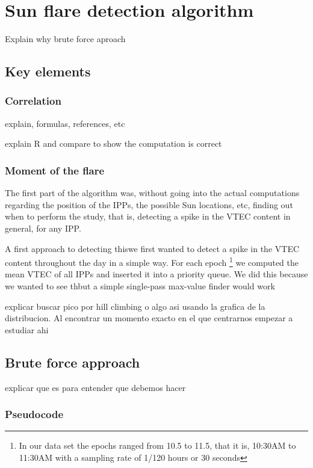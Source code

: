 \chapter{Sun flare detection algorithm}

Explain why brute force aproach


\section{Key elements}

\subsection{Correlation}

explain, formulas, references, etc

explain R and compare to show the computation is correct

\subsection{Moment of the flare}

The first part of the algorithm was, without going into the actual computations regarding the position of the IPPs, the possible Sun locations, etc, finding out when to perform the study, that is, detecting a spike in the VTEC content in general, for any IPP.

A first approach to detecting thiswe first wanted to detect a spike in the VTEC content throughout the day in a simple way. For each epoch \footnote{In our data set the epochs ranged from 10.5 to 11.5, that it is, 10:30AM to 11:30AM with a sampling rate of 1/120 hours or 30 seconds} we computed the mean VTEC of all IPPs and inserted it into a priority queue. We did this because we wanted to see thbut a simple single-pass max-value finder would work

explicar buscar pico por hill climbing o algo asi usando la grafica de la distribucion. Al encontrar un momento exacto en el que centrarnos empezar a estudiar ahi





\section{Brute force approach}

explicar que es para entender que debemos hacer

\subsection{Pseudocode}

